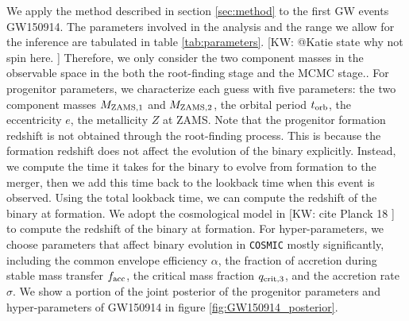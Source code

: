 \documentclass[twocolumn]{aastex631}
\newcommand{\kw}[1]{{\color{rb4}[KW: #1 ]}}
\begin{document}
We apply the method described in section \ref{sec:method} to the first GW events GW150914.
The parameters involved in the analysis and the range we allow for the inference are tabulated in table \ref{tab:parameters}.
\kw{@Katie state why not spin here.}
Therefore, we only consider the two component masses in the observable space in the both the root-finding stage and the MCMC stage..
For progenitor parameters, we characterize each guess with five parameters: the two component masses $M_{\rm ZAMS,1}$ and $M_{\rm ZAMS,2}$, the orbital period $t_{\rm orb}$, the eccentricity $e$, the metallicity $Z$ at ZAMS.
Note that the progenitor formation redshift is not obtained through the root-finding process.
This is because the formation redshift does not affect the evolution of the binary explicitly.
Instead, we compute the time it takes for the binary to evolve from formation to the merger, then we add this time back to the lookback time when this event is observed.
Using the total lookback time, we can compute the redshift of the binary at formation.
We adopt the cosmological model in \kw{cite Planck 18} to compute the redshift of the binary at formation.
For hyper-parameters, we choose parameters that affect binary evolution in \texttt{COSMIC} mostly significantly, including the common envelope efficiency $\alpha$, the fraction of accretion during stable mass transfer $f_{\rm acc}$, the critical mass fraction $q_{\rm crit,3}$, and the accretion rate $\sigma$.
We show a portion of the joint posterior of the progenitor parameters and hyper-parameters of GW150914 in figure \ref{fig:GW150914_posterior}.
\end{document}
